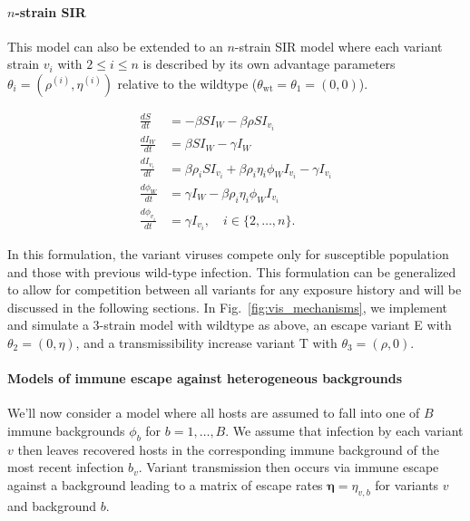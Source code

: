 \documentclass[12pt,oneside,letterpaper]{article}
\renewcommand{\vec}[1]{\boldsymbol{#1}}
\newcommand{\wt}{W}
\newcommand{\varEscape}{\eta}
\newcommand{\varTransmission}{\rho}
\def\tbc#1{\textcolor{purple}{[#1]}}
\begin{document}
\paragraph{$n$-strain SIR}%

This model can also be extended to an $n$-strain SIR model where each variant strain $v_i$ with $2\leq i \leq n$ is described by its own advantage parameters $\theta_{i} = (\varTransmission^{(i)}, \varEscape ^{(i)})$  relative to the wildtype ($\theta_{\text{wt}} = \theta_{1} = (0, 0)$).

\begin{align*}
    \frac{d S}{d t} &= - \beta S I_{\wt} - \beta \varTransmission S I_{v_{i}}\\
    \frac{d I_{\wt}}{dt} &= \beta S I_{\wt} - \gamma I_{\wt}\\
    \frac{d I_{v_{i}}}{dt} &= \beta \varTransmission_i S I_{v_{i}} + \beta \varTransmission_i \varEscape_i \phi_{\wt} I_{v_{i}} - \gamma I_{v_{i}}\\
    \frac{d \phi_{\wt}}{dt} &= \gamma I_{\wt} - \beta \varTransmission_i \varEscape_i \phi_{\wt} I_{v_{i}}\\
    \frac{d \phi_{v_{i}}}{dt} &= \gamma I_{v_{i}}, \quad i \in \{2, \ldots, n\}.
\end{align*}

In this formulation, the variant viruses compete only for susceptible population and those with previous wild-type infection.
This formulation can be generalized to allow for competition between all variants for any exposure history and will be discussed in the following sections.
In Fig.~\ref{fig:vis_mechanisms}, we implement and simulate a 3-strain model with wildtype as above, an escape variant E with $\theta_{2} = (0, \varEscape)$, and a transmissibility increase variant T with $\theta_{3} = (\varTransmission, 0)$.


\paragraph{Models of immune escape against heterogeneous backgrounds}%

We'll now consider a model where all hosts are assumed to fall into one of $B$ immune backgrounds $\phi_{b}$ for $b =1, \ldots, B$.
We assume that infection by each variant $v$ then leaves recovered hosts in the corresponding immune background of the most recent infection $b_{v}$.
Variant transmission then occurs via immune escape against a background leading to a matrix of escape rates $\vec{\varEscape} = \varEscape_{v,b}$ for variants $v$ and background $b$.
\end{document}
